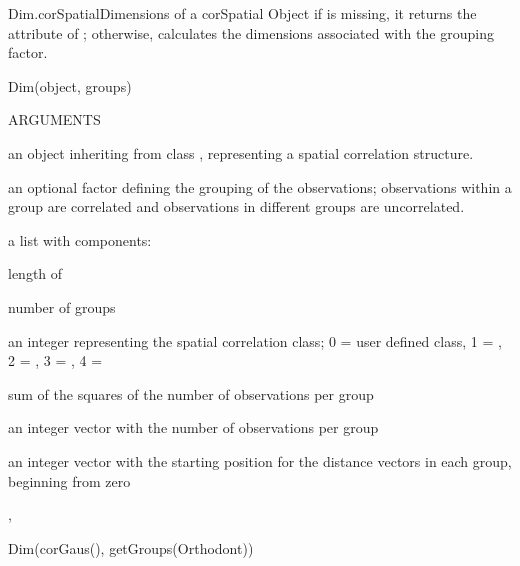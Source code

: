 \documentclass[pdftex]{article} \usepackage{url,graphicx}
\begin{document}
\begin{Helpfile}{Dim.corSpatial}{Dimensions of a corSpatial Object}
if  is missing, it returns the  attribute of
; otherwise, calculates the dimensions associated with
the grouping factor.
\begin{Example}
Dim(object, groups)
\end{Example}
\begin{Argument}{ARGUMENTS}
\item[\Co{object:}]
an object inheriting from class ,
representing a spatial correlation structure.
\item[\Co{groups:}]
an optional factor defining the grouping of the
observations; observations within a group are correlated and
observations in different groups are uncorrelated.
\end{Argument}
a list with components:
\begin{Argument}{}
\vspace{-16pt} 
\item[\Co{N:}]
length of 
\item[\Co{M:}]
number of groups
\item[\Co{spClass:}]
an integer representing the spatial correlation class;
0 = user defined class, 1 = , 2 = , 3 =
, 4 = 
\item[\Co{sumLenSq:}]
sum of the squares of the number of observations per
group
\item[\Co{len:}]
an integer vector with the number of observations per
group
\item[\Co{start:}]
an integer vector with the starting position for the
distance vectors in each group, beginning from zero
\end{Argument}
, 
\need 15pt
\vspace{-16pt} 
\begin{Example}
Dim(corGaus(), getGroups(Orthodont))
\end{Example}
\end{Helpfile}
\end{document}
